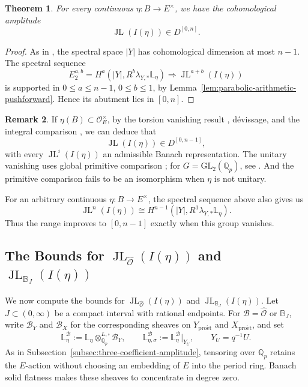 \documentclass[11pt]{article}
\newtheorem{theorem}{Theorem}[section]
\theoremstyle{definition}
\newtheorem{remark}[theorem]{Remark}
\newcommand{\Qp}{\mathbb Q_p}
\newcommand{\cO}{\mathcal O}
\newcommand{\proet}{\mathrm{pro\acute et}}
\newcommand{\JL}{\operatorname{JL}}
\begin{document}
\begin{theorem}
\label{thm:continuous-principal-series-amplitude}
For every continuous \(\eta:B\to E^\times\), we have the cohomological amplitude
\begin{equation*}
 \JL(I(\eta))\in D^{[0,n]}.
\end{equation*}
\end{theorem}
\begin{proof}
As in \cite[proof of Theorem~5.3.1]{JLH}, the spectral space
\(|Y|\) has cohomological dimension at most \(n-1\).
The spectral sequence
\begin{equation}%
 E_2^{a,b}=H^a(|Y|,R^b\lambda_{Y,*}\mathbb L_\eta)
 \Longrightarrow\JL^{a+b}(I(\eta))
\end{equation}
is supported in \(0\leq a\leq n-1\), \(0\leq b\leq1\),
by Lemma~\ref{lem:parabolic-arithmetic-pushforward}.
Hence its abutment lies in \([0,n]\).
\end{proof}
\begin{remark}
If \(\eta(B)\subset\cO_E^\times\), by the torsion vanishing result
\cite[Theorem~5.3.1]{JLH}, d\'evissage, and the integral
comparison \cite[Corollary~7.1.4]{DRC}, we can deduce that
\[
 \JL(I(\eta))\in D^{[0,n-1]},
\]
with every \(\JL^i(I(\eta))\) an admissible Banach representation.
The unitary vanishing uses global primitive comparison
\cite[Proposition~5.2.4]{JLH}; for \(G=\mathrm{GL}_2(\Qp)\),
see \cite[Theorem~4.6]{Ludwig}. And the primitive comparison fails to be an isomorphism when $\eta$ is not unitary.

For an arbitrary continuous \(\eta:B\to E^\times\),
the spectral sequence above also gives us
\[
 \JL^n(I(\eta))
 \cong H^{n-1}(|Y|,R^1\lambda_{Y,*}\mathbb L_\eta).
\]
Thus the range improves to \([0,n-1]\) exactly when this
group vanishes. 
\end{remark}

\subsection{The Bounds for \texorpdfstring{$\JL_{\widehat{\mathscr{O}}}(I(\eta))$}{ } and \texorpdfstring{$\JL_{\mathbb{B}_J}(I(\eta))$}{ }}
\label{subsec:principal-series-geometric-coefficients}
We now compute the bounds for $\JL_{\widehat{\mathscr{O}}}(I(\eta))$ and $\JL_{\mathbb{B}_J}(I(\eta))$. 
Let \(J\subset(0,\infty)\) be a compact interval with rational
endpoints.  For \(\mathscr B=\widehat{\mathscr O}\) or
\(\mathbb B_J\), write \(\mathscr B_Y\) and \(\mathscr B_X\)
for the corresponding sheaves on \(Y_{\proet}\) and
\(X_{\proet}\), and set
\begin{equation*}
 \mathbb L_\eta^{\mathscr B}
 :=\mathbb L_\eta\otimes_{\Qp}^{L,\square}\mathscr B_Y,
 \qquad
 \mathbb L_{\eta,\sigma}^{\mathscr B}
 :=\mathbb L_\eta^{\mathscr B}|_{Y_U},
 \qquad Y_U=q^{-1}U.
\end{equation*}
As in Subsection~\ref{subsec:three-coefficient-amplitude}, tensoring
over \(\Qp\) retains the \(E\)-action without choosing an
embedding of \(E\) into the period ring.  Banach solid flatness
makes these sheaves to concentrate in degree zero.
\end{document}
